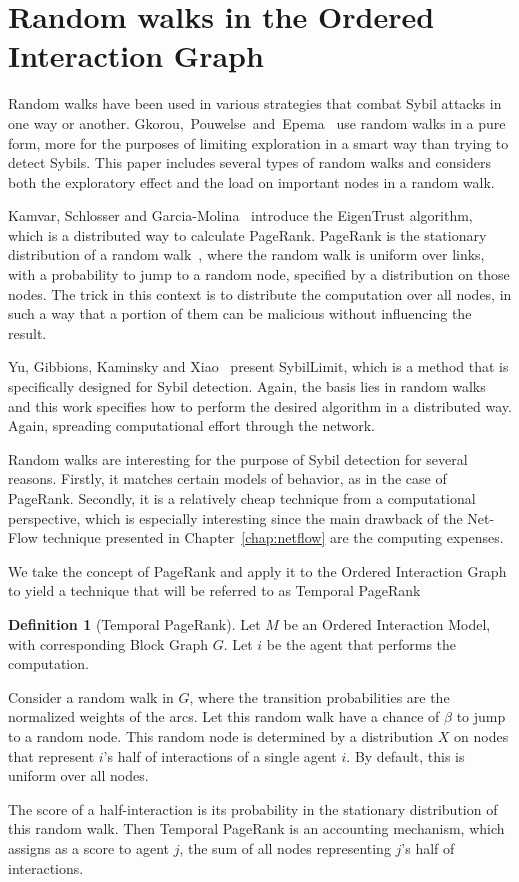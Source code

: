 \documentclass[a4paper,11pt]{book}
\theoremstyle{definition}
\newtheorem{definition}{Definition}
\begin{document}
\section{Random walks in the Ordered Interaction Graph}

Random walks have been used in various strategies that combat Sybil attacks
in one way or another. Gkorou,~Pouwelse~and~Epema~\cite{gkorou2015trust} use random walks
in a pure form, more for the purposes of limiting exploration in
a smart way than trying to detect Sybils. This paper includes several types
of random walks and considers both the exploratory effect and the
load on important nodes in a random walk.

Kamvar, Schlosser and Garcia-Molina~\cite{kamvar2003eigentrust} introduce
the EigenTrust algorithm, which is a distributed way to calculate PageRank.
PageRank is the stationary distribution of a random walk~\cite{page1999pagerank},
where the random walk is uniform over links, with a probability to jump to a
random node, specified by a distribution on those nodes. The trick in this context
is to distribute the computation over all nodes, in such a way that a portion
of them can be malicious without influencing the result.

Yu, Gibbions, Kaminsky and Xiao~\cite{yu2008Sybillimit} present SybilLimit, which
is a method that is specifically designed for Sybil detection. Again, the basis
lies in random walks and this work specifies how to perform the desired
algorithm in a distributed way. Again, spreading computational effort through
the network. 

Random walks are interesting for the purpose of Sybil detection for several reasons.
Firstly, it matches certain models of behavior, as in the case of PageRank. Secondly, it 
is a relatively cheap technique from a computational perspective, which is especially
interesting since the main
drawback of the Net-Flow technique presented in Chapter~\ref{chap:netflow} 
are the computing expenses.

We take the concept of PageRank and apply it to the Ordered Interaction Graph to
yield a technique that will be referred to as Temporal PageRank

\begin{definition}[Temporal PageRank]
    Let $M$ be an Ordered Interaction Model, with corresponding Block Graph $G$. 
    Let $i$ be the agent that performs the computation.

    Consider a random walk in $G$, where the transition probabilities are the normalized
    weights of the arcs. Let this random walk have a chance of $\beta$ to jump to a random node.
    This random node is determined by a distribution $X$ on nodes that represent $i$'s half of interactions of
    a single agent $i$. By default, this is uniform over all nodes.

    The score of a half-interaction is its probability in the stationary distribution of this random walk.
    Then Temporal PageRank is an accounting mechanism, which assigns as a score to agent $j$, the
    sum of all nodes representing $j$'s half of interactions.
\end{definition}
\end{document}
